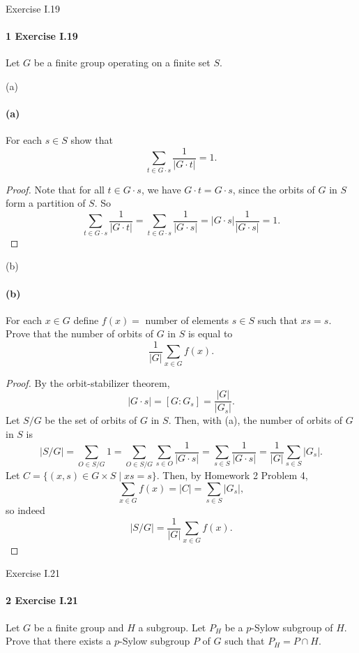 \documentclass[12pt]{article}
\newlength{\myparskip}
\newenvironment{fullbox}{\begin{lrbox}{\savefullbox}\begin{minipage}{\dimexpr\textwidth-2\fboxsep\relax}\setlength{\parskip}{\myparskip}}{\end{minipage}\end{lrbox}\framebox[\textwidth]{\usebox{\savefullbox}}}
\newenvironment{pbox}[1][]{\begin{fullbox}\ifx#1\empty\else\paragraph{#1}\fi}{\end{fullbox}}
\newcommand{\<}{\langle}
\renewcommand{\>}{\rangle}
\begin{document}
\thispagestyle{title}


\begin{pbox}[1 Exercise I.19]
    Let $G$ be a finite group operating on a finite set $S$.
\end{pbox}

\begin{pbox}[(a)]
    For each $s \in S$ show that
    \[
        \sum_{t \in G \cdot s} \frac{1}{|G \cdot t|} = 1.
    \]
\end{pbox}

\begin{proof}
    Note that for all $t \in G \cdot s$, we have $G \cdot t = G \cdot s$, since the orbits of $G$ in $S$ form a partition of $S$. So
    \[
        \sum_{t \in G \cdot s} \frac{1}{|G \cdot t|}
            = \sum_{t \in G \cdot s} \frac{1}{|G \cdot s|}
            = |G \cdot s| \frac{1}{|G \cdot s|}
            = 1.
    \]

\end{proof}

\begin{pbox}[(b)]
    For each $x \in G$ define $f(x) = $ number of elements $s \in S$ such that $xs = s$. Prove that the number of orbits of $G$ in $S$ is equal to
    \[
        \frac{1}{|G|}\sum_{x \in G} f(x).
    \]
\end{pbox}

\begin{proof}
    By the orbit-stabilizer theorem,
    \[
        |G \cdot s|
            = [G : G_s]
            = \frac{|G|}{|G_s|}.
    \]
    Let $S/G$ be the set of orbits of $G$ in $S$. Then, with (a), the number of orbits of $G$ in $S$ is
    \[
        |S/G|
            = \sum_{O \in S/G} 1
            = \sum_{O \in S/G} \sum_{s \in O} \frac{1}{|G \cdot s|}
            = \sum_{s \in S} \frac{1}{|G \cdot s|}
            = \frac{1}{|G|} \sum_{s \in S} |G_s|.
    \]
    Let $C = \{(x, s) \in G \times S \mid xs = s\}$. Then, by Homework 2 Problem 4,
    \[
        \sum_{x \in G} f(x) = |C| = \sum_{s \in S} |G_s|,
    \]
    so indeed
    \[
        |S/G| = \frac{1}{|G|} \sum_{x \in G} f(x).
    \]


\end{proof}


\newpage
\begin{pbox}[2 Exercise I.21]
    Let $G$ be a finite group and $H$ a subgroup. Let $P_H$ be a $p$-Sylow subgroup of $H$. Prove that there exists a $p$-Sylow subgroup $P$ of $G$ such that $P_H = P \cap H$.
\end{pbox}
\end{document}
